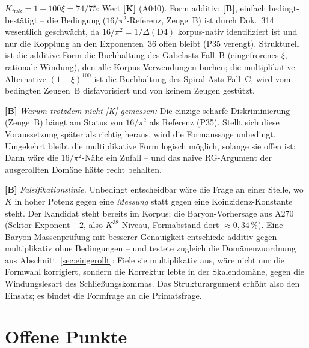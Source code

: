 \begin{keyresult}[Buchungsstand]
$K_\text{frak} = 1-100\xi = 74/75$: Wert \textbf{[K]} (A040). Form
additiv: \textbf{[B]}, einfach bedingt-best\"atigt -- die Bedingung
($16/\pi^2$-Referenz, Zeuge~B) ist durch Dok.~314 wesentlich geschw\"acht, da
$16/\pi^2 = 1/\Delta(\mathrm{D4})$ korpus-nativ identifiziert ist und
nur die Kopplung an den Exponenten~$36$ offen bleibt (P35 verengt).
Strukturell ist die additive Form die Buchhaltung des Gabelasts
Fall~B (eingefrorenes $\xi$, rationale Windung), den alle
Korpus-Verwendungen buchen; die multiplikative Alternative
$(1-\xi)^{100}$ ist die Buchhaltung des Spiral-Asts Fall~C, wird vom
bedingten Zeugen~B disfavorisiert und von keinem Zeugen gest\"utzt.
\end{keyresult}


\textbf{[B]} \emph{Warum trotzdem nicht [K]-gemessen:} Die einzige
scharfe Diskriminierung (Zeuge~B) h\"angt am Status von $16/\pi^2$ als
Referenz (P35). Stellt sich diese Voraussetzung sp\"ater als richtig
heraus, wird die Formaussage unbedingt. Umgekehrt bleibt die
multiplikative Form logisch m\"oglich, solange sie offen ist: Dann w\"are
die $16/\pi^2$-N\"ahe ein Zufall -- und das naive RG-Argument der
ausgerollten Dom\"ane h\"atte recht behalten.

\textbf{[B]} \emph{Falsifikationslinie.} Unbedingt entscheidbar w\"are die
Frage an einer Stelle, wo $K$ in hoher Potenz gegen eine \emph{Messung}
statt gegen eine Koinzidenz-Konstante steht. Der Kandidat steht bereits
im Korpus: die Baryon-Vorhersage aus A270 (Sektor-Exponent $+2$, also
$K^{38}$-Niveau, Formabstand dort $\approx0{,}34\,\%$). Eine
Baryon-Massenpr\"ufung mit besserer Genauigkeit entschiede additiv gegen
multiplikativ ohne Bedingungen -- und testete zugleich die
Dom\"anenzuordnung aus Abschnitt~\ref{sec:eingerollt}: Fiele sie
multiplikativ aus, w\"are nicht nur die Formwahl korrigiert, sondern die
Korrektur lebte in der Skalendom\"ane, gegen die Windungslesart des
Schlie\ss ungskommas. Das Strukturargument erh\"oht also den Einsatz; es
bindet die Formfrage an die Primatsfrage.

\section{Offene Punkte}

